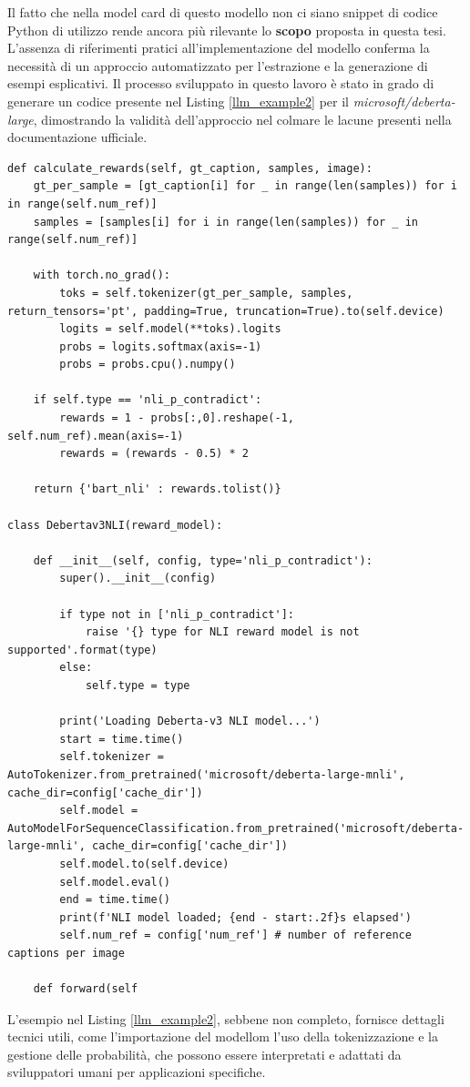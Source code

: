 \documentclass{article}
\begin{document}
Il fatto che nella model card di questo modello non ci siano snippet di codice Python di utilizzo rende ancora più rilevante lo \textbf{scopo} proposta in questa tesi. L'assenza di riferimenti pratici all'implementazione del modello conferma la necessità di un approccio automatizzato per l’estrazione e la generazione di esempi esplicativi. Il processo sviluppato in questo lavoro è stato in grado di generare un codice presente nel Listing \ref{llm_example2} per il \textit{microsoft/deberta-large}, dimostrando la validità dell’approccio nel colmare le lacune presenti nella documentazione ufficiale.\\
\begin{lstlisting}[caption={Esempio di output della generazione}, label={llm_example2}]
def calculate_rewards(self, gt_caption, samples, image):
    gt_per_sample = [gt_caption[i] for _ in range(len(samples)) for i in range(self.num_ref)]
    samples = [samples[i] for i in range(len(samples)) for _ in range(self.num_ref)]

    with torch.no_grad():
        toks = self.tokenizer(gt_per_sample, samples, return_tensors='pt', padding=True, truncation=True).to(self.device)     
        logits = self.model(**toks).logits
        probs = logits.softmax(axis=-1)
        probs = probs.cpu().numpy()

    if self.type == 'nli_p_contradict':
        rewards = 1 - probs[:,0].reshape(-1, self.num_ref).mean(axis=-1)
        rewards = (rewards - 0.5) * 2

    return {'bart_nli' : rewards.tolist()}

class Debertav3NLI(reward_model):

    def __init__(self, config, type='nli_p_contradict'):
        super().__init__(config)

        if type not in ['nli_p_contradict']:
            raise '{} type for NLI reward model is not supported'.format(type)
        else:
            self.type = type

        print('Loading Deberta-v3 NLI model...')
        start = time.time()
        self.tokenizer = AutoTokenizer.from_pretrained('microsoft/deberta-large-mnli', cache_dir=config['cache_dir'])
        self.model = AutoModelForSequenceClassification.from_pretrained('microsoft/deberta-large-mnli', cache_dir=config['cache_dir'])
        self.model.to(self.device)
        self.model.eval()
        end = time.time()
        print(f'NLI model loaded; {end - start:.2f}s elapsed')
        self.num_ref = config['num_ref'] # number of reference captions per image

    def forward(self
\end{lstlisting}
L'esempio nel Listing \ref{llm_example2}, sebbene non completo, fornisce dettagli tecnici utili, come l'importazione del modellom l'uso della tokenizzazione e la gestione delle probabilità, che possono essere interpretati e adattati da sviluppatori umani per applicazioni specifiche.
\end{document}
